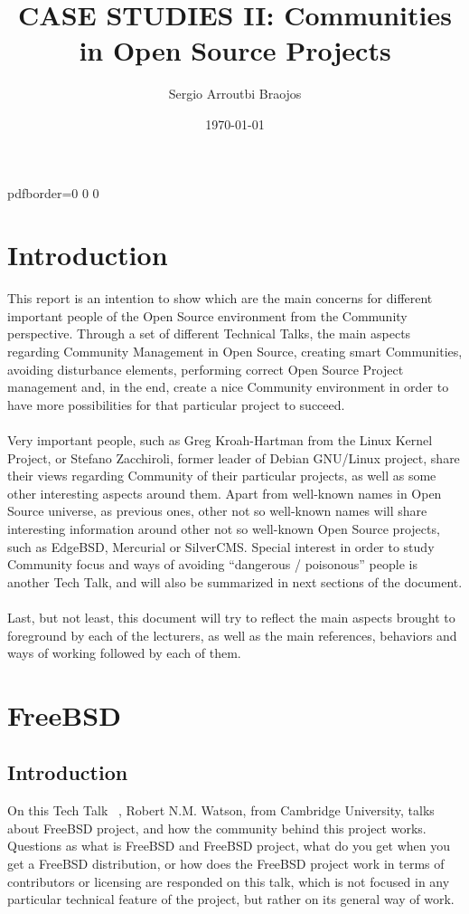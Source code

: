 \documentclass[11pt]{article}
\title{\textbf{CASE STUDIES II: Communities in Open Source Projects}}
\author{Sergio Arroutbi Braojos}
\date{\today}
\begin{document}
\hypersetup
{   
pdfborder={0 0 0}
}
   
\maketitle
\tableofcontents
\pagebreak

\section{Introduction}
\label{sec:Introduction}
This report is an intention to show which are the main concerns for different important people of the Open Source environment from the Community perspective. Through a set of different Technical Talks, the main aspects regarding Community Management in Open Source, creating smart Communities, avoiding disturbance elements, performing correct Open Source Project management and, in the end, create a nice Community environment in order to have more possibilities for that particular project to succeed.\\
\\
Very important people, such as Greg Kroah-Hartman from the Linux Kernel Project, or Stefano Zacchiroli, former leader of Debian GNU/Linux project, share their views regarding Community of their particular projects, as well as some other interesting aspects around them. Apart from well-known names in Open Source universe, as previous ones, other not so well-known names will share interesting information around other not so well-known Open Source projects, such as EdgeBSD, Mercurial or SilverCMS. Special interest in order to study Community focus and ways of avoiding ``dangerous / poisonous'' people is another Tech Talk, and will also be summarized in next sections of the document.\\
\\
Last, but not least, this document will try to reflect the main aspects brought to foreground by each of the lecturers, as well as the main references, behaviors and ways of working followed by each of them.

\pagebreak

\section{FreeBSD}
\label{sec:FreeBSD}
\subsection{Introduction}
On this Tech Talk ~\cite{TALK00}, Robert N.M. Watson, from Cambridge University, talks about FreeBSD project, and how the community behind this project works. Questions as what is FreeBSD and FreeBSD project, what do you get when you get a FreeBSD distribution, or how does the FreeBSD project work in terms of contributors or licensing are responded on this talk, which is not focused in any particular technical feature of the project, but rather on its general way of work.
\end{document}
